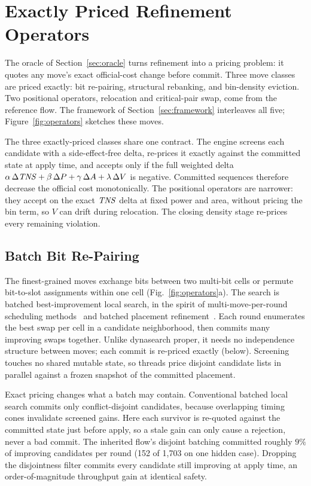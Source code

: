 \section{Exactly Priced Refinement Operators}\label{sec:operators}



The oracle of Section~\ref{sec:oracle} turns refinement into a pricing problem: it quotes any move's exact official-cost change before commit. Three move classes are priced exactly: bit re-pairing, structural rebanking, and bin-density eviction. Two positional operators, relocation and critical-pair swap, come from the reference flow. The framework of Section~\ref{sec:framework} interleaves all five; Figure~\ref{fig:operators} sketches these moves.

The three exactly-priced classes share one contract. The engine screens each candidate with a side-effect-free delta, re-prices it exactly against the committed state at apply time, and accepts only if the full weighted delta $\alpha\,\Delta\mathit{TNS} + \beta\,\Delta P + \gamma\,\Delta A + \lambda\,\Delta V$ is negative. Committed sequences therefore decrease the official cost monotonically. The positional operators are narrower: they accept on the exact $\mathit{TNS}$ delta at fixed power and area, without pricing the bin term, so $V$ can drift during relocation. The closing density stage re-prices every remaining violation.

\subsection{Batch Bit Re-Pairing}\label{sec:bitrepair}

The finest-grained moves exchange bits between two multi-bit cells or permute bit-to-slot assignments within one cell (Fig.~\ref{fig:operators}a). The search is batched best-improvement local search, in the spirit of multi-move-per-round scheduling methods~\cite{congram2002dynasearch} and batched placement refinement~\cite{lin2020abcdplace,pan2005fastdp}. Each round enumerates the best swap per cell in a candidate neighborhood, then commits many improving swaps together. Unlike dynasearch proper, it needs no independence structure between moves; each commit is re-priced exactly (below). Screening touches no shared mutable state, so threads price disjoint candidate lists in parallel against a frozen snapshot of the committed placement.

Exact pricing changes what a batch may contain. Conventional batched local search commits only conflict-disjoint candidates, because overlapping timing cones invalidate screened gains. Here each survivor is re-quoted against the committed state just before apply, so a stale gain can only cause a rejection, never a bad commit. The inherited flow's disjoint batching committed roughly $9\%$ of improving candidates per round (152 of 1{,}703 on one hidden case). Dropping the disjointness filter commits every candidate still improving at apply time, an order-of-magnitude throughput gain at identical safety.

